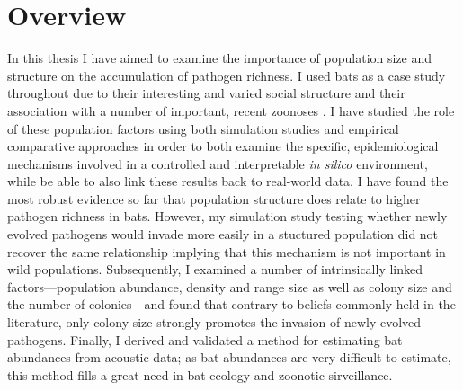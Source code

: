 
\section{Overview}

In this thesis I have aimed to examine the importance of population size and structure on the accumulation of pathogen richness.
I used bats as a case study throughout due to their interesting and varied social structure \cite{kerth2008causes} and their association with a number of important, recent zoonoses \cite{leroy2005fruit, field2001natural, halpin2011pteropid, li2005bats, field2001natural}.
I have studied the role of these population factors using both simulation studies and empirical comparative approaches in order to both examine the specific, epidemiological mechanisms involved in a controlled and interpretable \emph{in silico} environment, while be able to also link these results back to real-world data.
I have found the most robust evidence so far that population structure does relate to higher pathogen richness in bats.
However, my simulation study testing whether newly evolved pathogens would invade more easily in a stuctured population did not recover the same relationship implying that this mechanism is not important in wild populations.
Subsequently, I examined a number of intrinsically linked factors---population abundance, density and range size as well as colony size and the number of colonies---and found that contrary to beliefs commonly held in the literature, only colony size strongly promotes the invasion of newly evolved pathogens.
Finally, I derived and validated a method for estimating bat abundances from acoustic data; as bat abundances are very difficult to estimate, this method fills a great need in bat ecology and zoonotic sirveillance.




